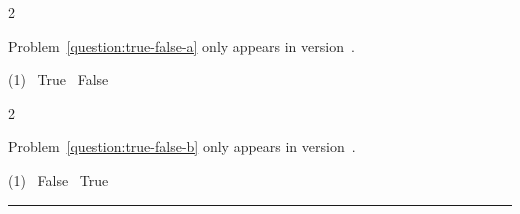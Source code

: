 \begin{question}[class=A]{2}
  \label{question:true-false-a}
  \TrueFalseInstructions \\
  \begin{minipage}{0.85\textwidth}
    Problem~\ref{question:true-false-a} only appears in version~\GetVersionID.
  \end{minipage}%
  \begin{minipage}{0.15\textwidth}
    \begin{tasks}(1)
      \task[\choice] \ True
      \task[\correctchoice] \ False
    \end{tasks}
  \end{minipage}
\end{question}

\begin{question}[class=B]{2}
  \label{question:true-false-b}
  \TrueFalseInstructions \\
  \begin{minipage}{0.85\textwidth}
    Problem~\ref{question:true-false-b} only appears in version~\GetVersionID.
  \end{minipage}%
  \begin{minipage}{0.15\textwidth}
    \begin{tasks}(1)
      \task[\correctchoice] \ False
      \task[\choice] \ True
    \end{tasks}
  \end{minipage}
\end{question}

\noindent\rule{\textwidth}{1pt}
